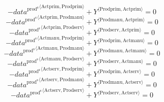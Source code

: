 \begin{equation}
-{{d\!a\!t\!a}^{\mathrm{prod}^{\mathrm{s}}}}^{\langle \mathrm{\mathrm{Actprim}},\mathrm{\mathrm{Prodprim}}\rangle} + {Y}^{\langle \mathrm{Prodprim},\mathrm{Actprim}\rangle} = 0
\end{equation}
\begin{equation}
-{{d\!a\!t\!a}^{\mathrm{prod}^{\mathrm{s}}}}^{\langle \mathrm{\mathrm{Actprim}},\mathrm{\mathrm{Prodmanu}}\rangle} + {Y}^{\langle \mathrm{Prodmanu},\mathrm{Actprim}\rangle} = 0
\end{equation}
\begin{equation}
-{{d\!a\!t\!a}^{\mathrm{prod}^{\mathrm{s}}}}^{\langle \mathrm{\mathrm{Actprim}},\mathrm{\mathrm{Prodserv}}\rangle} + {Y}^{\langle \mathrm{Prodserv},\mathrm{Actprim}\rangle} = 0
\end{equation}
\begin{equation}
-{{d\!a\!t\!a}^{\mathrm{prod}^{\mathrm{s}}}}^{\langle \mathrm{\mathrm{Actmanu}},\mathrm{\mathrm{Prodprim}}\rangle} + {Y}^{\langle \mathrm{Prodprim},\mathrm{Actmanu}\rangle} = 0
\end{equation}
\begin{equation}
-{{d\!a\!t\!a}^{\mathrm{prod}^{\mathrm{s}}}}^{\langle \mathrm{\mathrm{Actmanu}},\mathrm{\mathrm{Prodmanu}}\rangle} + {Y}^{\langle \mathrm{Prodmanu},\mathrm{Actmanu}\rangle} = 0
\end{equation}
\begin{equation}
-{{d\!a\!t\!a}^{\mathrm{prod}^{\mathrm{s}}}}^{\langle \mathrm{\mathrm{Actmanu}},\mathrm{\mathrm{Prodserv}}\rangle} + {Y}^{\langle \mathrm{Prodserv},\mathrm{Actmanu}\rangle} = 0
\end{equation}
\begin{equation}
-{{d\!a\!t\!a}^{\mathrm{prod}^{\mathrm{s}}}}^{\langle \mathrm{\mathrm{Actserv}},\mathrm{\mathrm{Prodprim}}\rangle} + {Y}^{\langle \mathrm{Prodprim},\mathrm{Actserv}\rangle} = 0
\end{equation}
\begin{equation}
-{{d\!a\!t\!a}^{\mathrm{prod}^{\mathrm{s}}}}^{\langle \mathrm{\mathrm{Actserv}},\mathrm{\mathrm{Prodmanu}}\rangle} + {Y}^{\langle \mathrm{Prodmanu},\mathrm{Actserv}\rangle} = 0
\end{equation}
\begin{equation}
-{{d\!a\!t\!a}^{\mathrm{prod}^{\mathrm{s}}}}^{\langle \mathrm{\mathrm{Actserv}},\mathrm{\mathrm{Prodserv}}\rangle} + {Y}^{\langle \mathrm{Prodserv},\mathrm{Actserv}\rangle} = 0
\end{equation}
